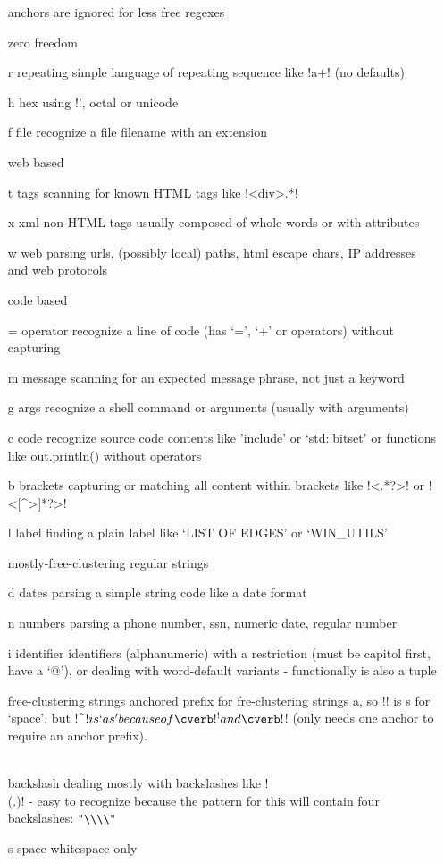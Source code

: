\begin{itemize}
anchors are ignored for less free regexes

zero freedom
\item[ r ] repeating     simple language of repeating sequence like \cverb!a+! (no defaults)
\item[ h ] hex           using \cverb!\x[a-f0-9][a-f0-9]!, octal or unicode
\item[ f ] file       recognize a file filename with an extension

web based
\item[ t ] tags      scanning for known HTML tags like \cverb!<div>.*!
\item[ x ] xml       non-HTML tags usually composed of whole words or with attributes
\item[ w ] web       parsing urls, (possibly local) paths, html escape chars, IP addresses and web protocols

code based
\item[ = ] operator  recognize a line of code (has `=', `+' or operators) without capturing
\item[ m ] message      scanning for an expected message phrase, not just a keyword
\item[ g ] args         recognize a shell command or arguments (usually with arguments)
\item[ c ] code         recognize source code contents like 'include' or `std::bitset' or functions like out.println() without operators
\item[ b ] brackets  capturing or matching all content within brackets like \cverb!<.*?>! or \cverb!<[^>]*?>!
\item[ l ] label      finding a plain label like `LIST OF EDGES' or `WIN_UTILS'

mostly-free-clustering regular strings

\item[ d ] dates         parsing a simple string code like a date format
\item[ n ] numbers       parsing a phone number, ssn, numeric date, regular number
\item[ i ] identifier    identifiers (alphanumeric) with a restriction (must be capitol first, have a `@'), or dealing with word-default variants - functionally is also a tuple

free-clustering strings
anchored prefix for fre-clustering strings a, so \cverb!\s*! is s for `space', but \cverb!^\s*$! is `as' because of \cverb!^! and \cverb!$! (only needs one anchor to require an anchor prefix).
\item[ \\ ] backslash    dealing mostly with backslashes like \cverb!\\(.)! - easy to recognize because the pattern for this will contain four backslashes: \verb!"\\\\"!
\item[ s ] space         whitespace only


\end{itemize}
